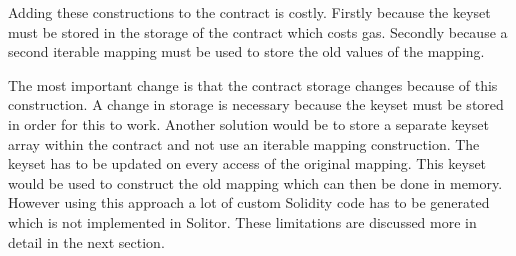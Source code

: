 \documentclass[a4paper]{article}
\begin{document}
\par
Adding these constructions to the contract is costly. Firstly because the keyset must be stored in the storage of the contract which costs gas. Secondly because a second iterable mapping must be used to store the old values of the mapping. \par
The most important change is that the contract storage changes because of this construction. A change in storage is necessary because the keyset must be stored in order for this to work. Another solution would be to store a separate keyset array within the contract and not use an iterable mapping construction. The keyset has to be updated on every access of the original mapping. This keyset would be used to construct the old mapping which can then be done in memory. However using this approach a lot of custom Solidity code has to be generated which is not implemented in Solitor. These limitations are discussed more in detail in the next section.
\newpage
\end{document}
